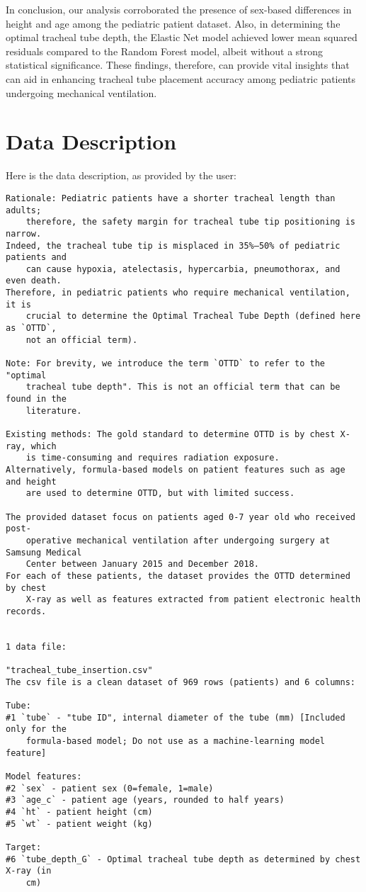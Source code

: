 \documentclass[11pt]{article}
\begin{document}
In conclusion, our analysis corroborated the presence of sex-based differences in height and age among the pediatric patient dataset. Also, in determining the optimal tracheal tube depth, the Elastic Net model achieved lower mean squared residuals compared to the Random Forest model, albeit without a strong statistical significance. These findings, therefore, can provide vital insights that can aid in enhancing tracheal tube placement accuracy among pediatric patients undergoing mechanical ventilation.


\clearpage
\appendix

\section{Data Description} \label{sec:data_description} Here is the data description, as provided by the user:

\begin{Verbatim}[tabsize=4]
Rationale: Pediatric patients have a shorter tracheal length than adults;
	therefore, the safety margin for tracheal tube tip positioning is narrow.
Indeed, the tracheal tube tip is misplaced in 35%–50% of pediatric patients and
	can cause hypoxia, atelectasis, hypercarbia, pneumothorax, and even death.
Therefore, in pediatric patients who require mechanical ventilation, it is
	crucial to determine the Optimal Tracheal Tube Depth (defined here as `OTTD`,
	not an official term).

Note: For brevity, we introduce the term `OTTD` to refer to the "optimal
	tracheal tube depth". This is not an official term that can be found in the
	literature.

Existing methods: The gold standard to determine OTTD is by chest X-ray, which
	is time-consuming and requires radiation exposure.
Alternatively, formula-based models on patient features such as age and height
	are used to determine OTTD, but with limited success.

The provided dataset focus on patients aged 0-7 year old who received post-
	operative mechanical ventilation after undergoing surgery at Samsung Medical
	Center between January 2015 and December 2018.
For each of these patients, the dataset provides the OTTD determined by chest
	X-ray as well as features extracted from patient electronic health records.


1 data file:

"tracheal_tube_insertion.csv"
The csv file is a clean dataset of 969 rows (patients) and 6 columns:

Tube:
#1 `tube` - "tube ID", internal diameter of the tube (mm) [Included only for the
	formula-based model; Do not use as a machine-learning model feature]

Model features:
#2 `sex` - patient sex (0=female, 1=male)
#3 `age_c` - patient age (years, rounded to half years)
#4 `ht` - patient height (cm)
#5 `wt` - patient weight (kg)

Target:
#6 `tube_depth_G` - Optimal tracheal tube depth as determined by chest X-ray (in
	cm)



\end{Verbatim}
\end{document}
